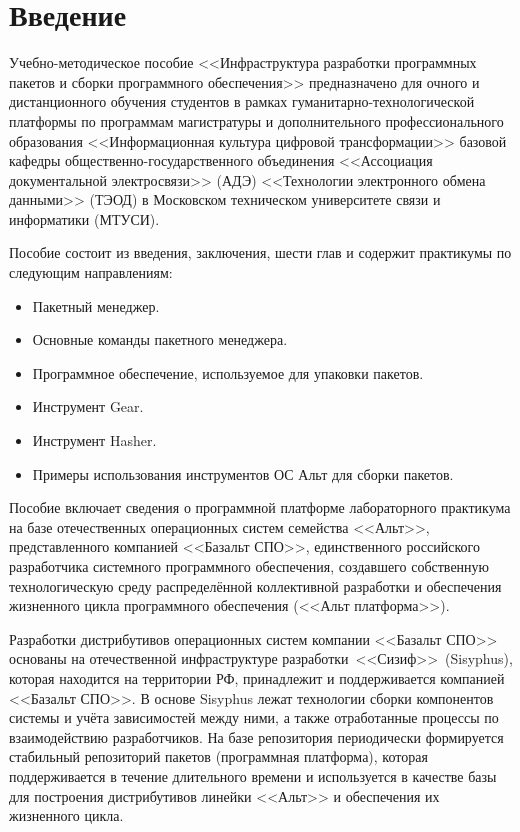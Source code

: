 \chapter*{Введение}

Учебно-методическое пособие <<Инфраструктура разработки программных пакетов и сборки 
программного обеспечения>> предназначено для очного и дистанционного обучения студентов 
в рамках гуманитарно-технологической платформы по программам магистратуры и 
дополнительного профессионального образования <<Информационная культура цифровой 
трансформации>> базовой кафедры общественно-государственного объединения <<Ассоциация 
документальной электросвязи>> (АДЭ) <<Технологии электронного обмена данными>> (ТЭОД) 
в Московском техническом университете связи и информатики (МТУСИ). 

Пособие состоит из введения, заключения, шести глав и содержит практикумы по следующим направлениям:
\begin{itemize}
	\item Пакетный менеджер.
	\item Основные команды пакетного менеджера.
	\item Программное обеспечение, используемое для упаковки пакетов.
	\item Инструмент Gear.
	\item Инструмент Hasher.
	\item Примеры использования инструментов ОС Альт для сборки пакетов.
\end{itemize}

Пособие включает сведения о программной платформе лабораторного практикума на базе 
отечественных операционных систем семейства <<Альт>>, представленного компанией <<Базальт СПО>>, 
единственного российского разработчика системного программного обеспечения, создавшего 
собственную технологическую среду распределённой коллективной разработки и обеспечения 
жизненного цикла программного обеспечения (<<Альт платформа>>).

Разработки дистрибутивов операционных систем компании <<Базальт СПО>> основаны на 
отечественной инфраструктуре разработки <<Сизиф>> (Sisyphus), которая находится на 
территории РФ, принадлежит и поддерживается компанией <<Базальт СПО>>. В основе 
Sisyphus лежат технологии сборки компонентов системы и учёта зависимостей между ними, а
также отработанные процессы по взаимодействию разработчиков. На базе репозитория
периодически формируется стабильный репозиторий пакетов (программная платформа), которая поддерживается
в течение длительного времени и используется в качестве базы для построения дистрибутивов 
линейки <<Альт>> и обеспечения их жизненного цикла.

